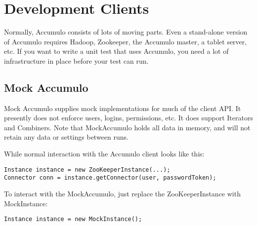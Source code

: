 
%
%

\chapter{Development Clients}

Normally, Accumulo consists of lots of moving parts. Even a stand-alone version of
Accumulo requires Hadoop, Zookeeper, the Accumulo master, a tablet server, etc. If
you want to write a unit test that uses Accumulo, you need a lot of infrastructure
in place before your test can run.

\section{Mock Accumulo}

Mock Accumulo supplies mock implementations for much of the client API. It presently
does not enforce users, logins, permissions, etc. It does support Iterators and Combiners.
Note that MockAccumulo holds all data in memory, and will not retain any data or
settings between runs.

While normal interaction with the Accumulo client looks like this:

\small
\begin{verbatim}
Instance instance = new ZooKeeperInstance(...);
Connector conn = instance.getConnector(user, passwordToken);
\end{verbatim}
\normalsize

To interact with the MockAccumulo, just replace the ZooKeeperInstance with MockInstance:

\small
\begin{verbatim}
Instance instance = new MockInstance();
\end{verbatim}
\normalsize

